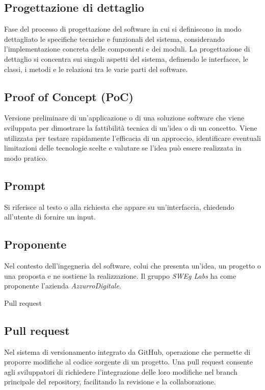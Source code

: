 \hypertarget{sec:progettazione_dettaglio}{}
\subsection*{Progettazione di dettaglio}
Fase del processo di progettazione del software in cui si definiscono in modo dettagliato le specifiche tecniche e funzionali del sistema, considerando
l'implementazione concreta delle componenti e dei moduli. La progettazione di dettaglio si concentra sui singoli aspetti del sistema, definendo le
interfacce, le classi, i metodi e le relazioni tra le varie parti del software.

\hypertarget{sec:PoC}{}
\subsection*{Proof of Concept (PoC)}
Versione preliminare di un’applicazione o di una soluzione software che viene sviluppata per dimostrare la fattibilità tecnica di un’idea o di un concetto. 
Viene utilizzata per testare rapidamente l’efficacia di un approccio, identificare eventuali limitazioni delle tecnologie scelte e valutare se l’idea può 
essere realizzata in modo pratico.

\hypertarget{sec:Prompt}{}
\subsection*{Prompt}
Si riferisce al testo o alla richiesta che appare su un'interfaccia, chiedendo all'utente di fornire un input. 

\hypertarget{sec:proponente}{}
\subsection*{Proponente}
Nel contesto dell’ingegneria del software, colui che presenta un’idea, un progetto o una proposta e ne sostiene la realizzazione. Il gruppo \emph{SWEg Labs} 
ha come proponente l’azienda \emph{AzzurroDigitale}.

\hypertarget{sec:pull_request}{Pull request}
\subsection*{Pull request}
Nel sistema di versionamento integrato da GitHub, operazione che permette di proporre modifiche al codice sorgente di un progetto. 
Una pull request consente agli sviluppatori di richiedere l’integrazione delle loro modifiche nel branch principale del repository, 
facilitando la revisione e la collaborazione.

